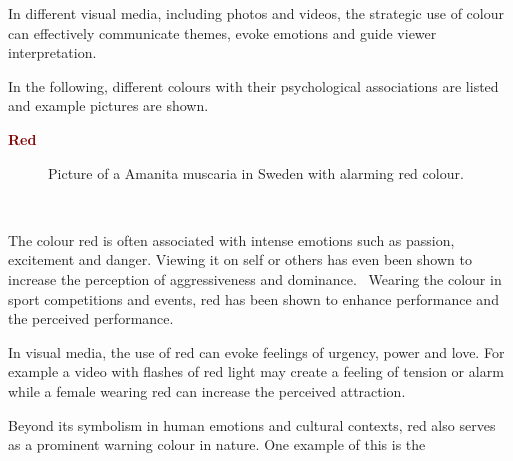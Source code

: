 \documentclass[../MasterThesis.tex]{subfiles}
\begin{document}
In different visual media, including photos and videos, the strategic use of colour can effectively communicate themes, evoke emotions and guide viewer interpretation.~\cite{cc_cg_1, cc_cg_2, colour, colour2}


In the following, different colours with their psychological associations are listed and example pictures are shown.



\textbf{\textcolor{Maroon}{Red}}

%
%

\begin{minipage}{0.5\textwidth}
	\begin{figure}[H]
		\begin{center}
			\caption[Picture of an Amanita muscaria in Sweden with alarming red colour.]{Picture of a Amanita muscaria in Sweden with alarming red colour.}
			\label{figure:red}
		\end{center}
	\end{figure}
 \hfill
\end{minipage}\begin{minipage}{0.05\textwidth}
	\ 
\end{minipage}\begin{minipage}{0.45\textwidth}
	The colour red is often associated with intense emotions such as passion, excitement and danger. Viewing it on self or others has even been shown to increase the perception of aggressiveness and dominance.~\cite{red_dominance} Wearing the colour in sport competitions and events, red has been shown to enhance performance and the perceived performance.~\cite{colour, red_sport}
	
	In visual media, the use of red can evoke feelings of urgency, power and love. For example a video with flashes of red light may create a feeling of tension or alarm while a female wearing red can increase the perceived attraction.~\cite{colour, red_romance}
	
	Beyond its symbolism in human emotions and cultural contexts, red also serves as a prominent warning colour in nature. One example of this is the
	
\end{minipage}
\end{document}
